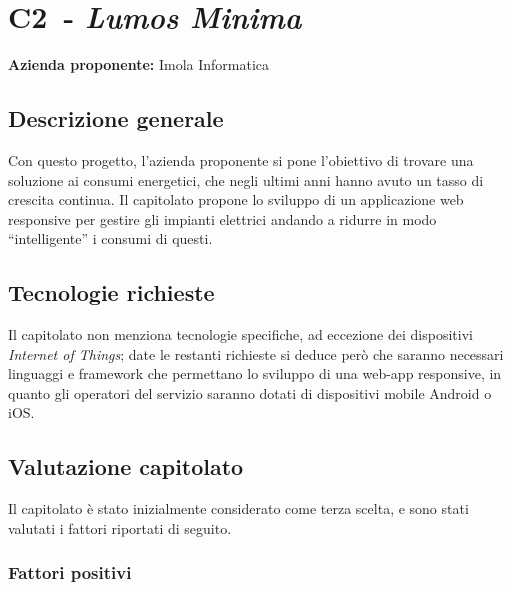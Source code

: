 
\renewcommand{\capName}{\textit{Lumos Minima}} %
\renewcommand{\capCode}{C2} %
\renewcommand{\capLink}{https://www.math.unipd.it/~tullio/IS-1/2022/Progetto/C2.pdf} %
\renewcommand{\capProposer}{ImolaInformatica} %


\section{\capCode\ - \capName}
\textbf{Azienda proponente:} Imola Informatica
\subsection{Descrizione generale}
Con questo progetto, l'azienda proponente si pone l'obiettivo di trovare una soluzione ai consumi energetici, che negli ultimi anni hanno avuto un tasso di crescita continua. Il capitolato propone lo sviluppo di un applicazione web responsive per gestire gli impianti elettrici andando a ridurre in modo “intelligente” i consumi di questi.
\subsection{Tecnologie richieste}
Il capitolato non menziona tecnologie specifiche, ad eccezione dei dispositivi \textit{Internet of Things}; date le restanti richieste si deduce però che saranno necessari linguaggi e framework che permettano lo sviluppo di una web-app responsive, in quanto gli operatori del servizio saranno dotati di dispositivi mobile Android o iOS.

\subsection{Valutazione capitolato}
Il capitolato è stato inizialmente considerato come terza scelta, e sono stati valutati i fattori riportati di seguito.

\subsubsection{Fattori positivi}

